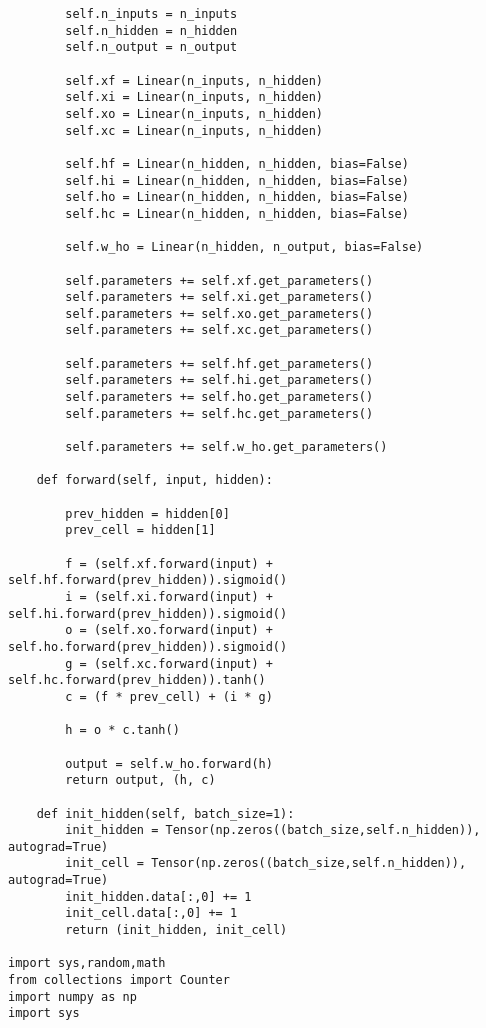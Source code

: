 \documentclass[12pt]{article}
\begin{document}
\begin{verbatim}
        self.n_inputs = n_inputs
        self.n_hidden = n_hidden
        self.n_output = n_output

        self.xf = Linear(n_inputs, n_hidden)
        self.xi = Linear(n_inputs, n_hidden)
        self.xo = Linear(n_inputs, n_hidden)        
        self.xc = Linear(n_inputs, n_hidden)        
        
        self.hf = Linear(n_hidden, n_hidden, bias=False)
        self.hi = Linear(n_hidden, n_hidden, bias=False)
        self.ho = Linear(n_hidden, n_hidden, bias=False)
        self.hc = Linear(n_hidden, n_hidden, bias=False)        
        
        self.w_ho = Linear(n_hidden, n_output, bias=False)
        
        self.parameters += self.xf.get_parameters()
        self.parameters += self.xi.get_parameters()
        self.parameters += self.xo.get_parameters()
        self.parameters += self.xc.get_parameters()

        self.parameters += self.hf.get_parameters()
        self.parameters += self.hi.get_parameters()        
        self.parameters += self.ho.get_parameters()        
        self.parameters += self.hc.get_parameters()                
        
        self.parameters += self.w_ho.get_parameters()        
    
    def forward(self, input, hidden):
        
        prev_hidden = hidden[0]        
        prev_cell = hidden[1]
        
        f = (self.xf.forward(input) + self.hf.forward(prev_hidden)).sigmoid()
        i = (self.xi.forward(input) + self.hi.forward(prev_hidden)).sigmoid()
        o = (self.xo.forward(input) + self.ho.forward(prev_hidden)).sigmoid()        
        g = (self.xc.forward(input) + self.hc.forward(prev_hidden)).tanh()        
        c = (f * prev_cell) + (i * g)

        h = o * c.tanh()
        
        output = self.w_ho.forward(h)
        return output, (h, c)
    
    def init_hidden(self, batch_size=1):
        init_hidden = Tensor(np.zeros((batch_size,self.n_hidden)), autograd=True)
        init_cell = Tensor(np.zeros((batch_size,self.n_hidden)), autograd=True)
        init_hidden.data[:,0] += 1
        init_cell.data[:,0] += 1
        return (init_hidden, init_cell)

import sys,random,math
from collections import Counter
import numpy as np
import sys


\end{verbatim}
\end{document}
